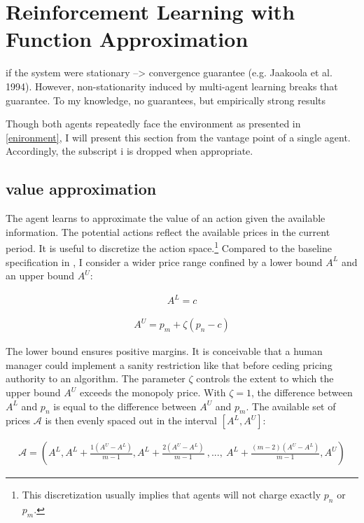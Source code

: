 \section{Reinforcement Learning with Function Approximation}

if the system were stationary --> convergence guarantee (e.g. Jaakoola et al. 1994). However, non-stationarity induced by multi-agent learning breaks that guarantee. To my knowledge, no guarantees, but empirically strong results

Though both agents repeatedly face the environment as presented in \autoref{enironment}, I will present this section from the vantage point of a single agent. Accordingly, the subscript {i} is dropped when appropriate.

\subsection{value approximation}\label{value_approximation}

The agent learns to approximate the value of an action given the available information. The potential actions reflect the available prices in the current period. It is useful to discretize the action space.\footnote{This discretization usually implies that agents will not charge exactly $p_n$ or $p_m$.} Compared to the baseline specification in \textcite{calvano_artificial_2019}, I consider a wider price range confined by a lower bound $A^L$ and an upper bound $A^U$:

\begin{gather}
A^{L} = c
\end{gather}

\begin{gather}
A^{U} = p_m + \zeta (p_n - c)
\end{gather}

The lower bound ensures positive margins. It is conceivable that a human manager could implement a sanity restriction like that before ceding pricing authority to an algorithm. The parameter $\zeta$ controls the extent to which the upper bound $A^U$ exceeds the monopoly price. With $\zeta = 1$, the difference between $A^{L}$ and $p_n$ is equal to the difference between $A^{U}$ and $p_m$. The available set of prices $\mathcal{A}$ is then evenly spaced out in the interval $[A^L, A^U]$:

\begin{gather}
	\mathcal{A} = (A^L, A^L + \frac{1(A^U - A^L)}{m-1}, A^L + \frac{2(A^U - A^L)}{m-1}~ , ... , ~ A^L + \frac{(m-2)(A^U - A^L)}{m-1}, A^U)
\end{gather}

